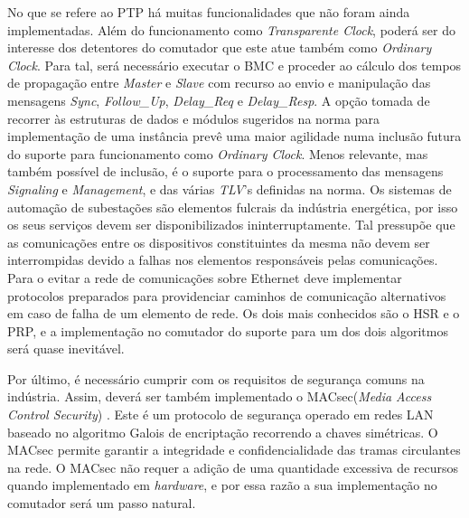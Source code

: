 No que se refere ao PTP há muitas funcionalidades que não foram ainda implementadas. Além do funcionamento como \textit{Transparente Clock}, poderá ser do interesse dos detentores do comutador que este atue também como \textit{Ordinary Clock}. Para tal, será necessário executar o BMC e proceder ao cálculo dos tempos de propagação entre \textit{Master} e \textit{Slave} com recurso ao envio e manipulação das mensagens \textit{Sync}, \textit{Follow\_Up}, \textit{Delay\_Req} e \textit{Delay\_Resp}. A opção tomada de recorrer às estruturas de dados e módulos sugeridos na norma para implementação de uma instância prevê uma maior agilidade numa inclusão futura do suporte para funcionamento como \textit{Ordinary Clock}. Menos relevante, mas também possível de inclusão, é o suporte para o processamento das mensagens \textit{Signaling} e \textit{Management}, e das várias \textit{TLV}'s definidas na norma.
Os sistemas de automação de subestações são elementos fulcrais da indústria energética, por isso os seus serviços devem ser disponibilizados ininterruptamente. Tal pressupõe que as comunicações entre os dispositivos constituintes da mesma não devem ser interrompidas devido a falhas nos elementos responsáveis pelas comunicações. Para o evitar a rede de comunicações sobre Ethernet deve implementar protocolos preparados para providenciar caminhos de comunicação alternativos em caso de falha de um elemento de rede. Os dois mais conhecidos são o HSR e o PRP, e a implementação no comutador do suporte para um dos dois algoritmos será quase inevitável. \par 
Por último, é necessário cumprir com os requisitos de segurança comuns na indústria. Assim, deverá ser também implementado o MACsec(\textit{Media Access Control Security}) \cite{MACSec}. Este é um protocolo de segurança operado em redes LAN baseado no algoritmo Galois de encriptação recorrendo a chaves simétricas. O MACsec permite garantir a integridade e confidencialidade das tramas circulantes na rede. O MACsec não requer a adição de uma quantidade excessiva de recursos quando implementado em \textit{hardware}, e por essa razão a sua implementação no comutador será um passo natural.